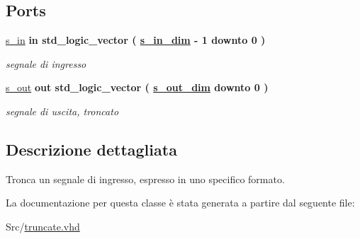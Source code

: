 \subsection*{Ports}
 \begin{DoxyCompactItemize}
\item 
\hypertarget{classtruncate_ga6d6bd3ddfff26c223f1752f25545e304}{\hyperlink{group___truncation_ga6d6bd3ddfff26c223f1752f25545e304}{s\+\_\+in}  {\bfseries {\bfseries \textcolor{vhdlchar}{in}\textcolor{vhdlchar}{ }}} {\bfseries \textcolor{vhdlchar}{std\+\_\+logic\+\_\+vector}\textcolor{vhdlchar}{ }\textcolor{vhdlchar}{(}\textcolor{vhdlchar}{ }\textcolor{vhdlchar}{ }\textcolor{vhdlchar}{ }\textcolor{vhdlchar}{ }{\bfseries \hyperlink{group___truncation_gad3d18243ad6fe53a2277e2aa9b94ca45}{s\+\_\+in\+\_\+dim}} \textcolor{vhdlchar}{-\/}\textcolor{vhdlchar}{ } \textcolor{vhdldigit}{1} \textcolor{vhdlchar}{ }\textcolor{vhdlchar}{downto}\textcolor{vhdlchar}{ }\textcolor{vhdlchar}{ } \textcolor{vhdldigit}{0} \textcolor{vhdlchar}{ }\textcolor{vhdlchar}{)}\textcolor{vhdlchar}{ }} }\label{classtruncate_ga6d6bd3ddfff26c223f1752f25545e304}

\begin{DoxyCompactList}\small\item\em segnale di ingresso \end{DoxyCompactList}\item 
\hypertarget{classtruncate_ga7c0b5e84820296cfa624ce710d19debd}{\hyperlink{group___truncation_ga7c0b5e84820296cfa624ce710d19debd}{s\+\_\+out}  {\bfseries {\bfseries \textcolor{vhdlchar}{out}\textcolor{vhdlchar}{ }}} {\bfseries \textcolor{vhdlchar}{std\+\_\+logic\+\_\+vector}\textcolor{vhdlchar}{ }\textcolor{vhdlchar}{(}\textcolor{vhdlchar}{ }\textcolor{vhdlchar}{ }\textcolor{vhdlchar}{ }\textcolor{vhdlchar}{ }{\bfseries \hyperlink{group___truncation_ga8b62f8bfecb0fab845995b8b051101bc}{s\+\_\+out\+\_\+dim}} \textcolor{vhdlchar}{ }\textcolor{vhdlchar}{downto}\textcolor{vhdlchar}{ }\textcolor{vhdlchar}{ } \textcolor{vhdldigit}{0} \textcolor{vhdlchar}{ }\textcolor{vhdlchar}{)}\textcolor{vhdlchar}{ }} }\label{classtruncate_ga7c0b5e84820296cfa624ce710d19debd}

\begin{DoxyCompactList}\small\item\em segnale di uscita, troncato \end{DoxyCompactList}\end{DoxyCompactItemize}


\subsection{Descrizione dettagliata}
Tronca un segnale di ingresso, espresso in uno specifico formato. 

La documentazione per questa classe è stata generata a partire dal seguente file\+:\begin{DoxyCompactItemize}
\item 
Src/\hyperlink{truncate_8vhd}{truncate.\+vhd}\end{DoxyCompactItemize}
